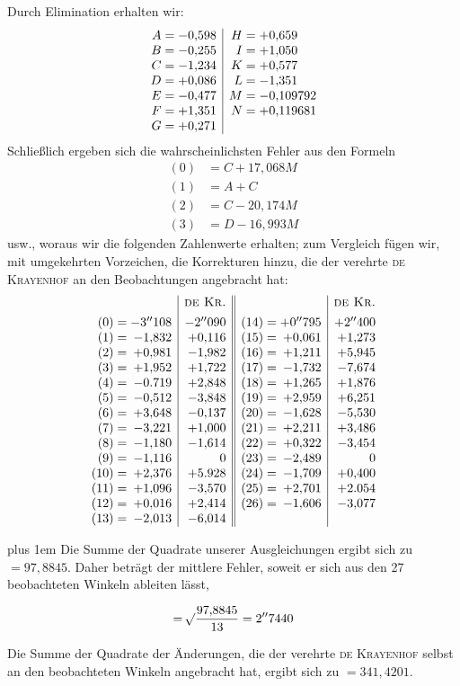 Durch Elimination erhalten wir:
\[
\begin{array}{r@{\;}c@{\;}l|r@{\;}c@{\;}l}
A&=&-0{,}598&H&=&+0{,}659\\
B&=&-0{,}255&I&=&+1{,}050\\
C&=&-1{,}234&K&=&+0{,}577\\
D&=&+0{,}086&L&=&-1{,}351\\
E&=&-0{,}477&M&=&-0{,}109792\\
F&=&+1{,}351&N&=&+0{,}119681\\
G&=&+0{,}271&&&
\end{array}
\]
Schließlich ergeben sich die wahrscheinlichsten Fehler aus den Formeln
\[
\begin{aligned}
(0)&=C+17{,}068M\\
(1)&=A+C\\
(2)&=C-20{,}174M\\
(3)&=D-16{,}993M
\end{aligned}
\]
usw., woraus wir die folgenden Zahlenwerte erhalten; zum Vergleich fügen wir, mit umgekehrten Vorzeichen, die Korrekturen hinzu, die der verehrte \textsc{de Krayenhof} an den Beobachtungen angebracht hat:
\[
\begin{array}{r@{\;}c@{\;}r|r||r@{\;}c@{\;}r|r}
&&&\text{\textsc{de Kr.}}&&&&\text{\textsc{de Kr.}}\\[4pt]
(0)&=&-3''108&-2''090&(14)&=&+0''795&+2''400\\
(1)&=&-1{,}832&+0{,}116&(15)&=&+0{,}061&+1{,}273\\
(2)&=&+0{,}981&-1{,}982&(16)&=&+1{,}211&+5{,}945\\
(3)&=&+1{,}952&+1{,}722&(17)&=&-1{,}732&-7{,}674\\
(4)&=&-0.719&+2{,}848&(18)&=&+1{,}265&+1{,}876\\
(5)&=&-0{,}512&-3{,}848&(19)&=&+2{,}959&+6{,}251\\
(6)&=&+3{,}648&-0{,}137&(20)&=&-1{,}628&-5{,}530\\
(7)&=&-3{,}221&+1{,}000&(21)&=&+2{,}211&+3{,}486\\
(8)&=&-1{,}180&-1{,}614&(22)&=&+0{,}322&-3{,}454\\
(9)&=&-1{,}116&0&(23)&=&-2{,}489&0\\
(10)&=&+2{,}376&+5.928&(24)&=&-1{,}709&+0{,}400\\
(11)&=&+1{,}096&-3{,}570&(25)&=&+2{,}701&+2.054\\
(12)&=&+0{,}016&+2{,}414&(26)&=&-1{,}606&-3{,}077\\
(13)&=&-2{,}013&-6{,}014&&&&
\end{array}
\]

{\rightskip=0pt plus 1em Die Summe der Quadrate unserer Ausgleichungen ergibt sich zu \(=97{,}8845\). Daher beträgt der mittlere Fehler, soweit er sich aus den 27 beobachteten Winkeln ableiten lässt,\par}
\[
=\mathord{{}^{}\!\surd}\frac{97{,}8845}{13}=2''7440
\]

Die Summe der Quadrate der Änderungen, die der verehrte \textsc{de Krayenhof} selbst an den beobachteten Winkeln angebracht hat, ergibt sich zu \(=341{,}4201\).

